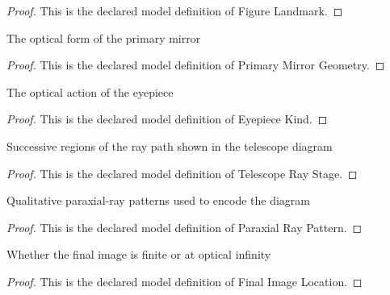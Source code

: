 \begin{proof}
  This is the declared model definition of Figure Landmark.
\end{proof}
\begin{definition}
  \label{def:physics:phyx-mini-0108:phyxminiproblems-problemphyxmini0108-primarymirrorgeometry}
  The optical form of the primary mirror
\end{definition}
\begin{proof}
  This is the declared model definition of Primary Mirror Geometry.
\end{proof}
\begin{definition}
  \label{def:physics:phyx-mini-0108:phyxminiproblems-problemphyxmini0108-eyepiecekind}
  The optical action of the eyepiece
\end{definition}
\begin{proof}
  This is the declared model definition of Eyepiece Kind.
\end{proof}
\begin{definition}
  \label{def:physics:phyx-mini-0108:phyxminiproblems-problemphyxmini0108-telescoperaystage}
  Successive regions of the ray path shown in the telescope diagram
\end{definition}
\begin{proof}
  This is the declared model definition of Telescope Ray Stage.
\end{proof}
\begin{definition}
  \label{def:physics:phyx-mini-0108:phyxminiproblems-problemphyxmini0108-paraxialraypattern}
  Qualitative paraxial-ray patterns used to encode the diagram
\end{definition}
\begin{proof}
  This is the declared model definition of Paraxial Ray Pattern.
\end{proof}
\begin{definition}
  \label{def:physics:phyx-mini-0108:phyxminiproblems-problemphyxmini0108-finalimagelocation}
  Whether the final image is finite or at optical infinity
\end{definition}
\begin{proof}
  This is the declared model definition of Final Image Location.
\end{proof}
